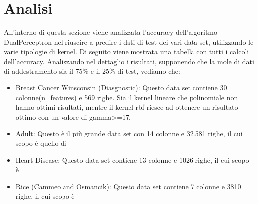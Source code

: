 \documentclass{article}
\begin{document}
	\section{Analisi}
	All'interno di questa sezione viene analizzata l'accuracy dell'algoritmo DualPerceptron nel riuscire a predire i dati di test dei vari data set, utilizzando le varie tipologie di kernel. Di seguito viene mostrata una tabella con tutti i calcoli dell'accuracy.  
	Analizzando nel dettaglio i risultati, supponendo che la mole di dati di addestramento sia il 75\% e il 25\% di test, vediamo che:
	\begin{itemize}
		\item Breast Cancer Winsconsin (Diasgnostic): Questo data set contiene 30 colonne(n\_features) e 569 righe. Sia il kernel lineare che polinomiale non hanno ottimi risultati, mentre il kernel rbf riesce ad ottenere un risultato ottimo con un valore di gamma>=17.
		\item Adult: Questo è il più grande data set con 14 colonne e 32.581 righe, il cui scopo è quello di 
		\item Heart Disease: Questo data set contiene 13 colonne e 1026 righe, il cui scopo è 
		\item Rice (Cammeo and Osmancik): Questo data set contiene 7 colonne e 3810 righe, il cui scopo è 
	\end{itemize}
\end{document}
